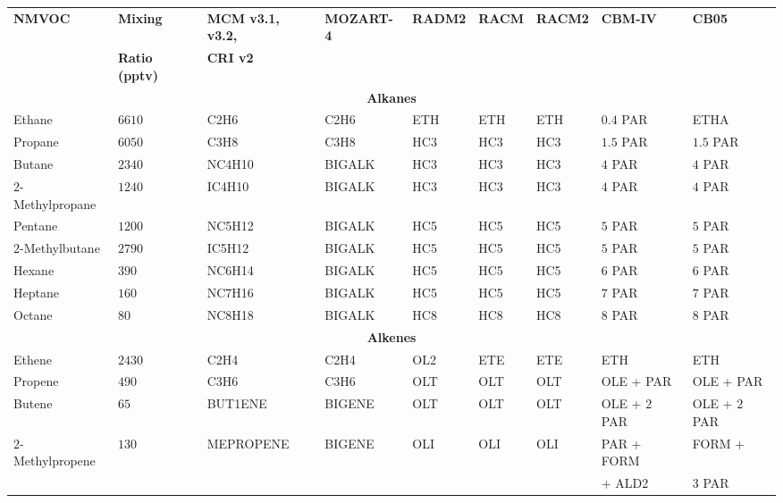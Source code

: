 \begin{sidewaystable}
    \centering
    \begin{tabular}{lllllllll}
        \hline \hline
        \multirow{2}{*}{\textbf{NMVOC}} & \textbf{Mixing} & \textbf{MCM v3.1, v3.2,} & \multirow{2}{*}{\textbf{MOZART-4}} & \multirow{2}{*}{\textbf{RADM2}} & \multirow{2}{*}{\textbf{RACM}} & \multirow{2}{*}{\textbf{RACM2}} & \multirow{2}{*}{\textbf{CBM-IV}} & \multirow{2}{*}{\textbf{CB05}}\\ & \textbf{Ratio (pptv)} & \textbf{CRI v2} & & & & & & \\ 
        \hline \hline \multicolumn{9}{c}{\textbf{Alkanes}}  \\ \hline
        Ethane & $6610$ & C2H6 & C2H6 & ETH & ETH & ETH & $0.4$ PAR & ETHA \\
        Propane  & $6050$ & C3H8 & C3H8 & HC3 & HC3 & HC3 & $1.5$ PAR & $1.5$ PAR \\
        Butane & $2340$ & NC4H10 & BIGALK & HC3 & HC3 & HC3 & $4$ PAR & $4$ PAR \\
        $2$-Methylpropane & $1240$ & IC4H10 & BIGALK & HC3 & HC3 & HC3 & $4$ PAR & $4$ PAR \\
        Pentane & $1200$ & NC5H12 & BIGALK & HC5 & HC5 & HC5 & $5$ PAR & $5$ PAR \\
        $2$-Methylbutane & $2790$ & IC5H12 & BIGALK & HC5 & HC5 & HC5 & $5$ PAR & $5$ PAR \\
        Hexane & $390$ & NC6H14 & BIGALK & HC5 & HC5 & HC5 & $6$ PAR & $6$ PAR \\
        Heptane & $160$ & NC7H16 &  BIGALK & HC5 & HC5 & HC5 & $7$ PAR & $7$ PAR \\
        Octane & $80$ & NC8H18 & BIGALK & HC8 & HC8 & HC8 & $8$ PAR & $8$ PAR \\ \hline 
        \multicolumn{9}{c}{\textbf{Alkenes}} \\ \hline
        Ethene & $2430$ & C2H4 & C2H4 & OL2 & ETE & ETE & ETH & ETH \\
        Propene & $490$ & C3H6 & C3H6 & OLT & OLT & OLT & OLE + PAR & OLE + PAR \\ 
        Butene & $65$ & BUT1ENE & BIGENE & OLT & OLT & OLT & OLE + $2$ PAR & OLE + $2$ PAR \\ 
        \multirow{2}{*}{$2$-Methylpropene} & \multirow{2}{*}{$130$} & \multirow{2}{*}{MEPROPENE} & \multirow{2}{*}{BIGENE} & \multirow{2}{*}{OLI} & \multirow{2}{*}{OLI} & \multirow{2}{*}{OLI} & PAR + FORM & FORM + \\ & & & & & & & \hspace{3mm}+ ALD2 & \hspace{3mm}$3$ PAR \\

\end{tabular}
\end{sidewaystable}

